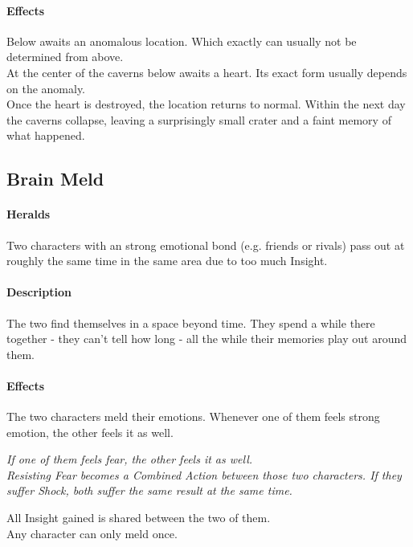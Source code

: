 \paragraph{Effects}
Below awaits an anomalous location.
Which exactly can usually not be determined from above.
\\%
At the center of the caverns below awaits a heart.
Its exact form usually depends on the anomaly.
\\%
Once the heart is destroyed,
	the location returns to normal.
Within the next day the caverns collapse,
	leaving a surprisingly small crater
	and a faint memory of what happened.
\subsection*{Brain Meld}
\paragraph{Heralds}
Two characters with an strong emotional bond (e.g. friends or rivals) pass out
	at roughly the same time
	in the same area
	due to too much Insight.
\paragraph{Description}
The two find themselves in a space beyond time.
They spend a while there together
	- they can't tell how long -
	all the while their memories play out around them.
\paragraph{Effects}
The two characters meld their emotions.
Whenever one of them feels strong emotion,
the other feels it as well.
\begin{exampleblock}
	\itshape
	If one of them feels fear,
	the other feels it as well.
	\\%
	Resisting Fear becomes a Combined Action between those two characters.
	If they suffer Shock, both suffer the same result at the same time.
\end{exampleblock}
All Insight gained is shared between the two of them.
\\%
Any character can only meld once.
